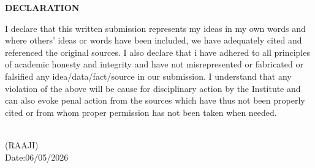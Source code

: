\documentclass[12pt]{report}
\begin{document}
\newpage 
\begin{center} 
\Huge \textbf{DECLARATION} 
\end{center} 
\linespread{1.5} 
\large{ 
 I declare that this written submission represents my ideas in my own words and where others' ideas or words have been included, we have adequately cited and referenced the original sources. I also declare that i have adhered to all principles of academic honesty and integrity and have not misrepresented or fabricated or falsified any idea/data/fact/source in our submission. I understand that any violation of the above will be cause for disciplinary action by the Institute and can also evoke penal action from the sources which have thus not been properly cited or from whom proper permission has not been taken when needed.} 
\vspace{2.0cm} 
\begin{flushright} 
\\ 
\large{(RAAJI)}\\ 
\large{Date:06/05/2026}\\[2.0cm] 
\\ 
\large{}\\ 
\large{}\\[2.0cm] 
\\ 
\large{}\\ 
\large{}\\[2.0cm] 
\end{flushright} 

 
\end{document}
